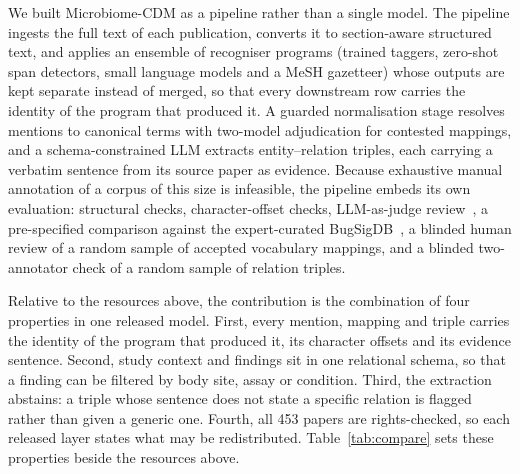 \documentclass[referee,lineno,pdflatex,sn-vancouver-num]{sn-jnl}
\theoremstyle{thmstyleone}%
\theoremstyle{thmstyletwo}%
\theoremstyle{thmstylethree}%
\begin{document}
We built Microbiome-CDM as a pipeline rather than a single model. The pipeline
ingests the full text of each publication, converts it to section-aware structured
text, and applies an ensemble of recogniser programs (trained taggers, zero-shot
span detectors, small language models and a MeSH gazetteer) whose outputs are kept
separate instead of merged, so that every downstream row carries the identity of the
program that produced it. A guarded normalisation stage resolves mentions to
canonical terms with two-model adjudication for contested mappings, and a
schema-constrained LLM extracts entity--relation triples, each carrying a verbatim
sentence from its source paper as evidence. Because exhaustive manual annotation
of a corpus of this size is infeasible, the pipeline embeds its own evaluation:
structural checks, character-offset checks, LLM-as-judge
review~\cite{zheng2023mtbench}, a pre-specified comparison against the
expert-curated BugSigDB~\cite{geistlinger2023}, a blinded human review of a
random sample of accepted vocabulary mappings, and a blinded two-annotator check
of a random sample of relation triples.

Relative to the resources above, the contribution is the combination of four
properties in one released model. First, every mention, mapping and triple
carries the identity of the program that produced it, its character offsets and
its evidence sentence. Second, study context and findings sit in one relational
schema, so that a finding can be filtered by body site, assay or condition.
Third, the extraction abstains: a triple whose sentence does not state a
specific relation is flagged rather than given a generic one. Fourth, all 453
papers are rights-checked, so each released layer states what may be
redistributed. Table~\ref{tab:compare} sets these properties beside the
resources above.
\end{document}
